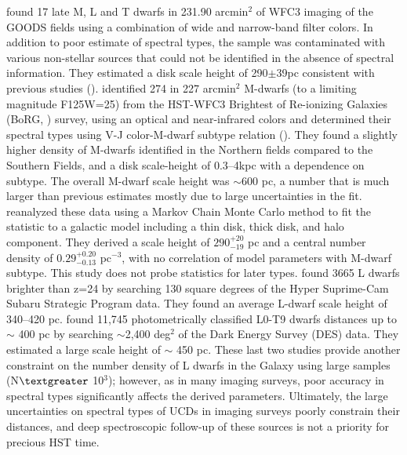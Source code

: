 \documentclass[manuscript]{aastex}
\begin{document}
\cite{Ryan2011} found 17 late M, L and T dwarfs in 231.90 arcmin$^2$ of  WFC3 imaging of the GOODS fields using a combination of wide and narrow-band filter colors. In addition to poor estimate of spectral types, the sample was contaminated with various non-stellar sources that could not be identified in the absence of spectral information. They estimated a disk scale height of 290$\pm$39pc consistent with previous studies (\citealt{2005ApJ...631L.159R, 2005ApJ...622..319P}). \cite{Holwerda2014} identified  274 in 227 arcmin$^2$ M-dwarfs (to a limiting magnitude F125W=25) from the HST-WFC3 Brightest of Re-ionizing Galaxies (BoRG, \citealt{2009ApJ...695.1591P}) survey, using an optical and near-infrared colors and determined their spectral types using  V-J color-M-dwarf subtype relation (\citealt{2009ApJ...695.1591P}). They found a slightly higher density of M-dwarfs identified in the Northern fields compared to the Southern Fields, and a  disk scale-height of 0.3--4kpc with a dependence on subtype. The overall M-dwarf scale height was $\sim$600 pc, a number that is much larger than previous estimates mostly due to large uncertainties in the fit. \cite{Vledder2016} reanalyzed these data using a Markov Chain Monte Carlo method to fit the statistic to a galactic model including a thin disk, thick disk, and halo component. They derived a scale height of $290^{+20}_{-19}$ pc and a central number density of  $0.29^{+0.20}_{-0.13}$ pc$^{-3}$, with no correlation of model parameters with M-dwarf subtype. This study does not probe statistics for later types. \cite{Sorahana2018} found 3665 L dwarfs brighter than z=24 by searching 130 square degrees of the Hyper Suprime-Cam Subaru Strategic Program data. They found an average L-dwarf scale height of 340--420 pc. \cite{2019arXiv190310806C} found 11,745 photometrically classified L0-T9 dwarfs distances up to $\sim$ 400 pc by searching $\sim$2,400 deg$^2$ of the Dark Energy Survey (DES) data. They estimated a large scale height of $\sim$ 450 pc. These last two studies provide another constraint on the number density of L dwarfs in the Galaxy using large samples (N$\textgreater$ 10$^3$); however, as in many imaging surveys, poor accuracy in spectral types significantly affects the derived parameters. Ultimately, the large uncertainties on spectral types  of UCDs in imaging surveys poorly constrain their distances, and deep spectroscopic follow-up of these sources is not a priority for precious HST time. 
\end{document}
